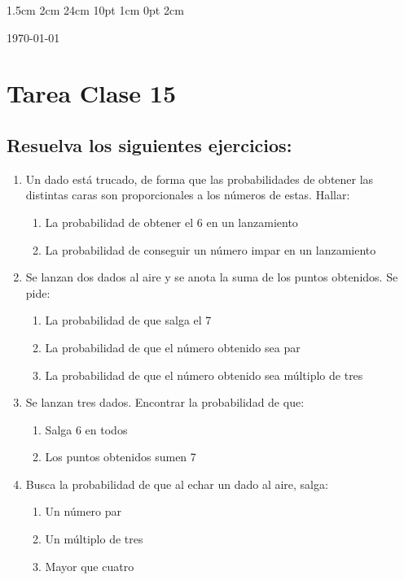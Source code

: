 \documentclass[12pt,letterpaper]{report}
\begin{document}
\setmargins{2.5cm}      
{1.5cm}                     
{2cm}  
{24cm}                    
{10pt}                          
{1cm}                          
{0pt}                             
{2cm}
\begin{flushright}
\today
\end{flushright}
\vspace{-1.75cm}
\section*{Tarea Clase 15}
\subsection*{Resuelva los siguientes ejercicios:}
\begin{enumerate}
    \item  Un dado está trucado, de forma que las probabilidades de obtener las distintas caras son proporcionales a los números de estas. Hallar:
    \begin{enumerate}
    \item La probabilidad de obtener el 6 en un lanzamiento
    \item La probabilidad de conseguir un número impar en un lanzamiento
    \end{enumerate}
    \item Se lanzan dos dados al aire y se anota la suma de los puntos obtenidos. Se pide:
    \begin{enumerate}
    \item La probabilidad de que salga el 7
    \item La probabilidad de que el número obtenido sea par
    \item La probabilidad de que el número obtenido sea múltiplo de tres 
    \end{enumerate}
    \item Se lanzan tres dados. Encontrar la probabilidad de que:
    \begin{enumerate}
    \item Salga 6 en todos
    \item Los puntos obtenidos sumen 7
    \end{enumerate}
    \item Busca la probabilidad de que al echar un dado al aire, salga:
    \begin{enumerate}
    \item Un número par
    \item Un múltiplo de tres
    \item Mayor que cuatro

\end{enumerate}
\end{enumerate}
\end{document}
